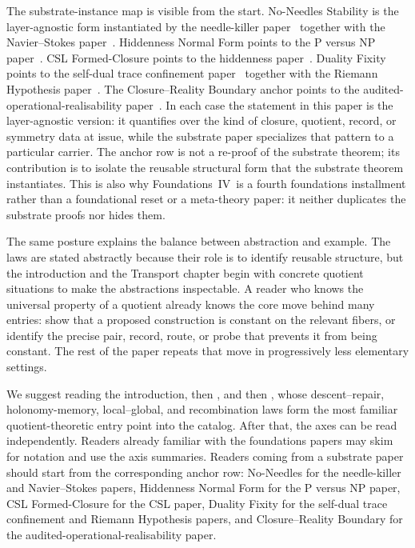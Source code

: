 \documentclass[11pt]{article}
\newcommand{\FIV}{Foundations~IV}
\newcommand{\PaperSDTC}{the self-dual trace confinement paper}
\newcommand{\PaperAOR}{the audited-operational-realisability paper}
\newcommand{\PaperNeedleKiller}{the needle-killer paper}
\newcommand{\PaperNS}{the Navier--Stokes paper}
\newcommand{\PaperRH}{the Riemann Hypothesis paper}
\newcommand{\PaperPvNP}{the P versus NP paper}
\newcommand{\PaperCSL}{the hiddenness paper}
\theoremstyle{definition}
\begin{document}
The substrate-instance map is visible from the start.  No-Needles
Stability is the layer-agnostic form instantiated by
\PaperNeedleKiller\ \citep{Tsiokos2026NeedleKiller} together with
\PaperNS\ \citep{Tsiokos2026NavierStokes}.  Hiddenness Normal Form
points to \PaperPvNP\ \citep{Tsiokos2026PvNP}.  CSL Formed-Closure
points to \PaperCSL\ \citep{Tsiokos2026CSL}.  Duality Fixity points
to \PaperSDTC\ \citep{Tsiokos2026SDTC} together with \PaperRH\
\citep{Tsiokos2026RH}.  The Closure--Reality Boundary anchor points
to \PaperAOR\ \citep{Tsiokos2026AOR}.  In each case the statement in
this paper is the layer-agnostic version: it quantifies over the
kind of closure, quotient, record, or symmetry data at issue, while
the substrate paper specializes that pattern to a particular
carrier.  The anchor row is not a re-proof of the substrate theorem;
its contribution is to isolate the reusable structural form that the
substrate theorem instantiates.  This is also why \FIV\ is a fourth
foundations installment rather than a foundational reset or a
meta-theory paper: it neither duplicates the substrate proofs nor
hides them.

The same posture explains the balance between abstraction and
example.  The laws are stated abstractly because their role is to
identify reusable structure, but the introduction and the Transport
chapter begin with concrete quotient situations to make the
abstractions inspectable.  A reader who knows the universal property
of a quotient already knows the core move behind many entries: show
that a proposed construction is constant on the relevant fibers, or
identify the precise pair, record, route, or probe that prevents it
from being constant.  The rest of the paper repeats that move in
progressively less elementary settings.

We suggest reading the introduction, then , and
then \Cref{sec:transport}, whose descent--repair, holonomy-memory,
local--global, and recombination laws form the most familiar
quotient-theoretic entry point into the catalog.  After that, the
axes can be read independently.  Readers already familiar with the
foundations papers may skim \Cref{sec:apparatus} for notation and
use the axis summaries.  Readers coming from a substrate paper
should start from the corresponding anchor row: No-Needles for the
needle-killer and Navier--Stokes papers, Hiddenness Normal Form for
the P versus NP paper, CSL Formed-Closure for the CSL paper, Duality
Fixity for the self-dual trace confinement and Riemann Hypothesis
papers, and Closure--Reality Boundary for the
audited-operational-realisability paper.
\end{document}
